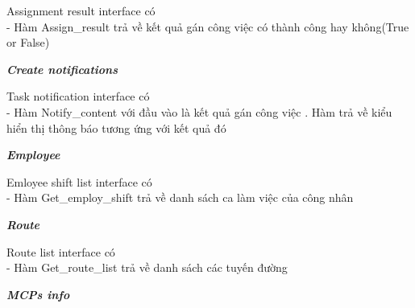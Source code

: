 \documentclass[a4paper]{article}
\begin{document}
\begin{itemize}
\begin{minipage}[b]{0.4\textwidth}
Assignment result interface có \\
- Hàm Assign\_result trả về kết quả gán công việc có thành công hay không(True or False)
\end{minipage}
\hfill
{}
\newpage
\textbf{\textit{Create notifications} }\\
\begin{minipage}[b]{0.4\textwidth}
Task notification interface có\\
- Hàm Notify\_content với đầu vào là kết quả gán công việc . Hàm trả về kiểu hiển thị thông báo tương ứng với kết quả đó
\end{minipage}
\hfill
{}
\newline
\newline
\textbf{\textit{Employee }} \\
\begin{minipage}[b]{0.4\textwidth}
Emloyee shift list interface có \\
- Hàm Get\_employ\_shift trả về danh sách ca làm việc của công nhân
\end{minipage}
\hfill
{}
\newline
\newline
\textbf{\textit{Route}} \\
\begin{minipage}[b]{0.4\textwidth}
Route list interface có\\
- Hàm Get\_route\_list trả về danh sách các tuyến đường
\end{minipage}
\hfill
{}
\newline
\newline
\textbf{\textit{MCPs info}} \\


\end{itemize}
\end{document}

